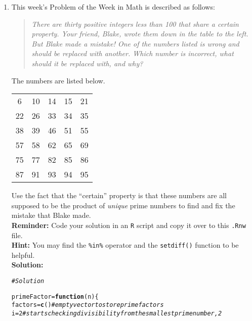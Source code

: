 \documentclass{article}\usepackage[]{graphicx}\usepackage[]{xcolor}
\makeatletter
\newcommand{\hlnum}[1]{\textcolor[rgb]{0.686,0.059,0.569}{#1}}%
\newcommand{\hlcom}[1]{\textcolor[rgb]{0.678,0.584,0.686}{\textit{#1}}}%
\newcommand{\hldef}[1]{\textcolor[rgb]{0.345,0.345,0.345}{#1}}%
\newcommand{\hlkwa}[1]{\textcolor[rgb]{0.161,0.373,0.58}{\textbf{#1}}}%
\newcommand{\hlkwb}[1]{\textcolor[rgb]{0.69,0.353,0.396}{#1}}%
\newcommand{\hlkwc}[1]{\textcolor[rgb]{0.333,0.667,0.333}{#1}}%
\newcommand{\hlkwd}[1]{\textcolor[rgb]{0.737,0.353,0.396}{\textbf{#1}}}%
\newenvironment{kframe}{%
 \def\at@end@of@kframe{}%
 \ifinner\ifhmode%
  \def\at@end@of@kframe{\end{minipage}}%
  \begin{minipage}{\columnwidth}%
 \fi\fi%
 \def\FrameCommand##1{\hskip\@totalleftmargin \hskip-\fboxsep
 \colorbox{shadecolor}{##1}\hskip-\fboxsep
     \hskip-\linewidth \hskip-\@totalleftmargin \hskip\columnwidth}%
 \MakeFramed {\advance\hsize-\width
   \@totalleftmargin\z@ \linewidth\hsize
   \@setminipage}}%
 {\par\unskip\endMakeFramed%
 \at@end@of@kframe}
\newenvironment{knitrout}{}{} %
\makeatother
\begin{document}
\begin{enumerate}
\item This week's Problem of the Week in Math is described as follows:
\begin{quotation}
  \textit{There are thirty positive integers less than 100 that share a certain 
  property. Your friend, Blake, wrote them down in the table to the left. But 
  Blake made a mistake! One of the numbers listed is wrong and should be replaced 
  with another. Which number is incorrect, what should it be replaced with, and 
  why?}
\end{quotation}
The numbers are listed below.
\begin{center}
  \begin{tabular}{ccccc}
    6 & 10 & 14 & 15 & 21\\
    22 & 26 & 33 & 34 & 35\\
    38 & 39 & 46 & 51 & 55\\
    57 & 58 & 62 & 65 & 69\\
    75 & 77 & 82 & 85 & 86\\
    87 & 91 & 93 & 94 & 95
  \end{tabular}
\end{center}
Use the fact that the ``certain'' property is that these numbers are all supposed
to be the product of \emph{unique} prime numbers to find and fix the mistake that
Blake made.\\
\textbf{Reminder:} Code your solution in an \texttt{R} script and copy it over
to this \texttt{.Rnw} file.\\
\textbf{Hint:} You may find the \verb|%in%| operator and the \verb|setdiff()| function to be helpful.\\

\textbf{Solution:} 

\begin{knitrout}\scriptsize
{}\color{fgcolor}\begin{kframe}
\begin{alltt}
\hlcom{# Solution}

\hldef{primeFactor} \hlkwb{=} \hlkwa{function}\hldef{(}\hlkwc{n}\hldef{) \{}
  \hldef{factors} \hlkwb{=} \hlkwd{c}\hldef{()} \hlcom{# empty vector to store prime factors}
  \hldef{i} \hlkwb{=} \hlnum{2} \hlcom{# starts checking divisibility from the smallest prime number, 2}


\end{alltt}
\end{kframe}
\end{knitrout}
\end{enumerate}
\end{document}
